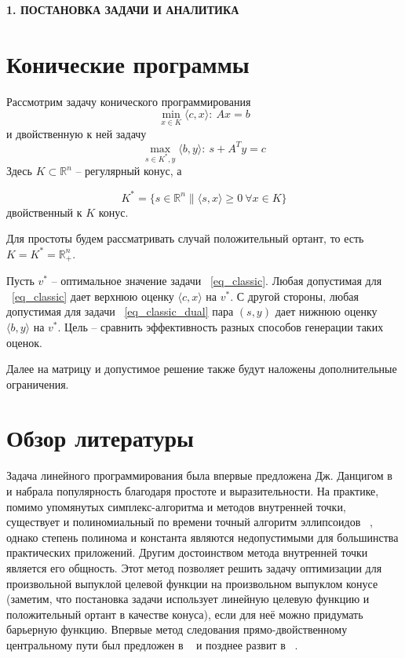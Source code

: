 \newpage
\begin{center}
  \textbf{\large 1. ПОСТАНОВКА ЗАДАЧИ И АНАЛИТИКА}
\end{center}


\section{Конические программы}

Рассмотрим задачу конического программирования
\begin{equation}
  \min_{x \in K} \langle c, x \rangle : \ Ax = b
\label{eq_classic}
\end{equation}
и двойственную к ней задачу
\begin{equation}
  \max_{s \in K^*, y} \langle b, y \rangle : \ s+A^Ty = c
\label{eq_classic_dual}
\end{equation}
Здесь $ K \subset \mathbb{R}^n $ -- регулярный конус, а

$$
K^* = \{ s \in \mathbb{R}^n \| \langle s, x \rangle \geq 0 \ \forall x \in K \}
$$
двойственный к $K$ конус.

Для простоты будем рассматривать случай положительный ортант, то есть $ K = K^* = \mathbb{R}^n_+ $.

Пусть $v^*$ -- оптимальное значение задачи ~\ref{eq_classic}. Любая допустимая для ~\ref{eq_classic} дает верхнюю оценку $ \langle c, x \rangle $ на $ v^* $. С другой стороны, любая допустимая для задачи ~\ref{eq_classic_dual} пара $ \left( s, y \right) $ дает нижнюю оценку $ \langle b, y \rangle $ на $ v^* $. Цель -- сравнить эффективность разных способов генерации таких оценок.

Далее на матрицу и допустимое решение также будут наложены дополнительные ограничения.

\section{Обзор литературы}
 
Задача линейного программирования была впервые предложена Дж. Данцигом в ~\cite{dantzig2002} и набрала популярность благодаря простоте и выразительности.
На практике, помимо упомянутых симплекс-алгоритма и методов внутренней точки, существует и полиномиальный по времени точный алгоритм эллипсоидов ~\cite{karmarkar1984}, однако степень полинома и константа являются недопустимыми для большинства практических приложений.
Другим достоинством метода внутренней точки является его общность. Этот метод позволяет решить задачу оптимизации для произвольной выпуклой целевой функции на произвольном выпуклом конусе ~\cite{nesterov1994} (заметим, что постановка задачи использует линейную целевую функцию и положительный ортант в качестве конуса), если для неё можно придумать барьерную функцию.
Впервые метод следования прямо-двойственному центральному пути был предложен в ~\cite{renegar1988} и позднее развит в ~\cite{nesterov1998}.

